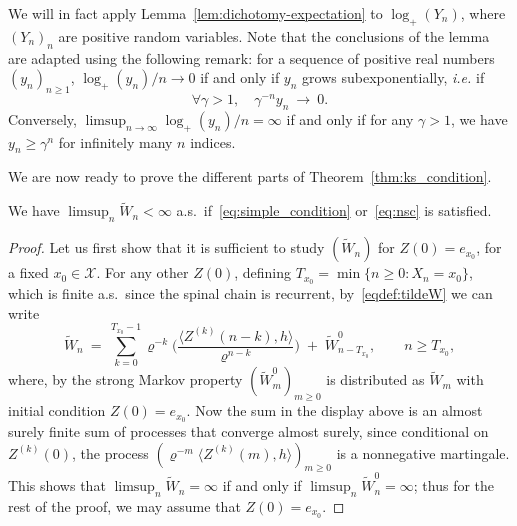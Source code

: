 \begin{refsegment}
We will in fact apply Lemma~\ref{lem:dichotomy-expectation} to
  $\log_+(Y_n)$, where $(Y_n)_n$ are positive random variables. Note
  that the conclusions of the lemma are adapted using the following
  remark: for a sequence of positive real numbers $(y_n)_{n\geq 1}$,
  $\log_+(y_n)/n\to 0$ if and only if $y_n$ grows subexponentially,
  \textit{i.e.} if
  \begin{equation}\label{eq:subexponential_growth}
    \forall \gamma>1, \quad \gamma^{-n}y_n \ \longrightarrow\ 0.
  \end{equation}
  Conversely, $\limsup_{n\to\infty} \log_+(y_n)/n = \infty$ if and only if for
  any $\gamma>1$, we have $y_n \geq \gamma^{n}$ for infinitely many
  $n$ indices. 

We are now ready to prove the different parts of Theorem~\ref{thm:ks_condition}.

\begin{prop}\label{prop:thm-ks-part1}
  We have $\limsup_n \widetilde{W}_n < \infty$ a.s.\ if~\eqref{eq:simple_condition} or~\eqref{eq:nsc} is satisfied.
\end{prop}

\begin{proof}
  Let us first show that it is sufficient to study $(\widetilde{W}_n)$ for $Z(0)=e_{x_0}$, for a fixed $x_0\in \mathcal{X}$.
  For any other $Z(0)$, defining $T_{x_0}=\min\{n \geq 0 : X_n = x_0\}$, which is finite a.s.\ since the spinal chain is recurrent, by~\eqref{eqdef:tildeW} we can write
  \[
    \widetilde{W}_n\ =\ \sum_{k=0}^{T_{x_0}-1} \varrho^{-k}\Big(\frac{\langle Z^{(k)}(n-k), h\rangle}{\varrho^{n-k}}\Big) \;+\; \widetilde{W}^{0}_{n-T_{x_0}}, \qquad n \geq T_{x_0},
  \]
  where, by the strong Markov property $(\widetilde{W}^{0}_{m})_{m\geq 0}$ is distributed as $\widetilde{W}_{m}$ with initial condition $Z(0)=e_{x_0}$.
  Now the sum in the display above is an almost surely finite sum of processes that converge almost surely, since conditional on $Z^{(k)}(0)$, the process $(\varrho^{-m}\langle Z^{(k)}(m), h \rangle)_{m\geq 0}$ is a nonnegative martingale.
  This shows that $\limsup_n\widetilde{W}_n=\infty$ if and only if $\limsup_n\widetilde{W}^0_n=\infty$; thus for the rest of the proof, we may assume that $Z(0)=e_{x_0}$.
  

\end{proof}
\end{refsegment}

